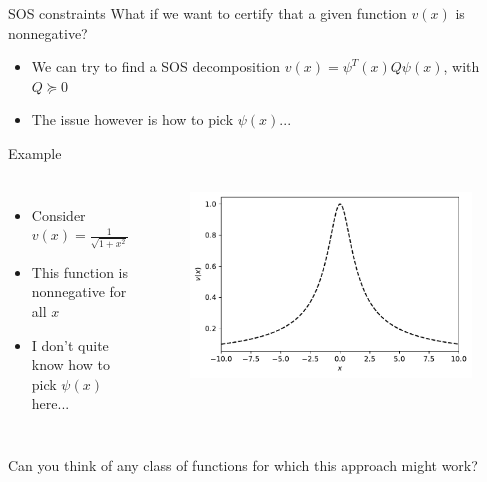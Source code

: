 \documentclass[aspectratio=169]{beamer}
\begin{document}
\begin{frame}{SOS constraints}
What if we want to certify that a given function $v(x)$ is nonnegative?
\begin{itemize}
\item
We can try to find a SOS decomposition $v(x) = \psi^T(x) Q \psi(x)$, with $Q \succeq 0$
\item
The issue however is how to pick $\psi(x)$...
\end{itemize}
\begin{block}{Example}
\begin{columns}
\begin{itemize}
\item
Consider $v(x) = \frac{1}{\sqrt{1 + x^2}}$
\item
This function is nonnegative for all $x$
\item
I don't quite know how to pick $\psi(x)$ here...
\end{itemize}
\begin{figure}
\includegraphics[width=\columnwidth]{figures/imq.pdf}
\end{figure}
\end{columns}
\end{block}
Can you think of any class of functions for which this approach might work?
\end{frame}
\end{document}
